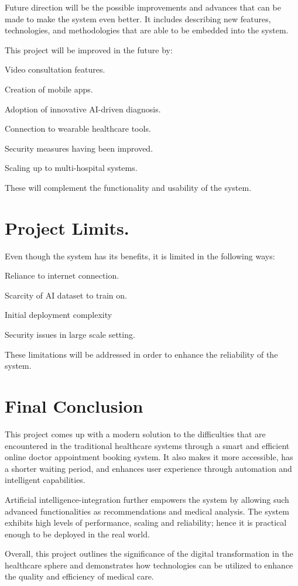 Future direction will be the possible improvements and advances that can be made to make the system even better. It includes describing new features, technologies, and methodologies that are able to be embedded into the system.

This project will be improved in the future by:

Video consultation features.

Creation of mobile apps.

Adoption of innovative AI-driven diagnosis.

Connection to wearable healthcare tools.

Security measures having been improved.

Scaling up to multi-hospital systems.

These will complement the functionality and usability of the system.

\section{Project Limits.}

Even though the system has its benefits, it is limited in the following ways:

Reliance to internet connection.

Scarcity of AI dataset to train on.

Initial deployment complexity

Security issues in large scale setting.

These limitations will be addressed in order to enhance the reliability of the system.

\section{Final Conclusion}

This project comes up with a modern solution to the difficulties that are encountered in the traditional healthcare systems through a smart and efficient online doctor appointment booking system. It also makes it more accessible, has a shorter waiting period, and enhances user experience through automation and intelligent capabilities.

Artificial intelligence-integration further empowers the system by allowing such advanced functionalities as recommendations and medical analysis. The system exhibits high levels of performance, scaling and reliability; hence it is practical enough to be deployed in the real world.

Overall, this project outlines the significance of the digital transformation in the healthcare sphere and demonstrates how technologies can be utilized to enhance the quality and efficiency of medical care.
